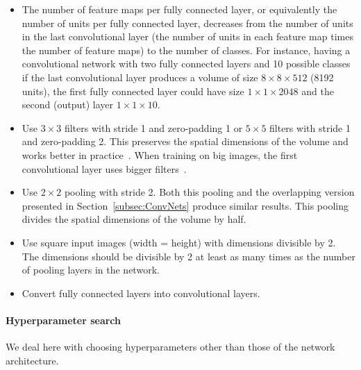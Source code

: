 \begin{itemize}
	\item The number of feature maps per fully connected layer, or equivalently the number of units per fully connected layer, decreases from the number of units in the last convolutional layer (the number of units in each feature map times the number of feature maps) to the number of classes. For instance, having a convolutional network with two fully connected layers and 10 possible classes if the last convolutional layer produces a volume of size $8 \times 8 \times 512$ (8192 units), the first fully connected layer could have size $1 \times 1 \times 2048$ and the second (output) layer $1\times 1\times 10$.

	\item Use $3\times 3$ filters with stride 1 and zero-padding 1 or $5 \times 5$ filters with stride 1 and zero-padding 2. This preserves the spatial dimensions of the volume and works better in practice~\cite{Springenberg2014}. When training on big images, the first convolutional layer uses bigger filters~\cite{Karpathy2015}.
	
	\item Use $2\times2$ pooling with stride 2. Both this pooling and the overlapping version presented in Section~\ref{subsec:ConvNets} produce similar results. This pooling divides the spatial dimensions of the volume by half.

	\item Use square input images (width = height) with dimensions divisible by 2. The dimensions should be divisible by 2 at least as many times as the number of pooling layers in the network.

	\item Convert fully connected layers into convolutional layers.
\end{itemize}



\paragraph{Hyperparameter search}
We deal here with choosing hyperparameters other than those of the network architecture.

